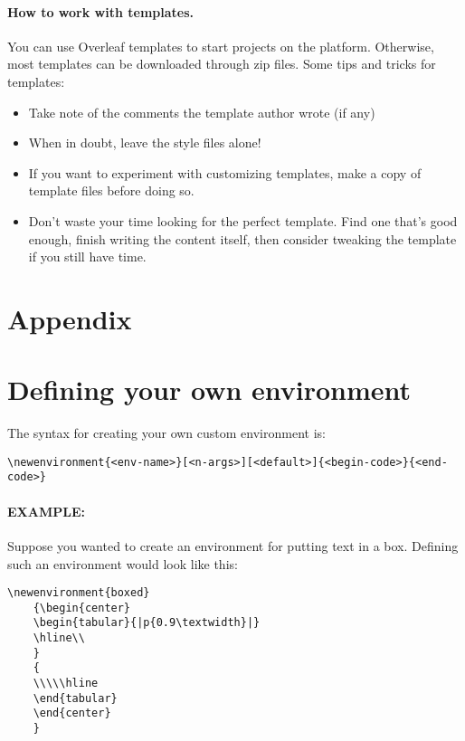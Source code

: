 \documentclass[11pt]{article}
\begin{document}
\paragraph{How to work with templates.} You can use Overleaf templates to start projects on the platform. Otherwise, most templates can be downloaded through zip files. Some tips and tricks for templates:

\begin{itemize}[noitemsep]
    \item Take note of the comments the template author wrote (if any)
    \item When in doubt, leave the style files alone!
    \item If you want to experiment with customizing templates, make a copy of template files before doing so.
    \item Don't waste your time looking for the perfect template. Find one that's good enough, finish writing the content itself, then consider tweaking the template if you still have time.
\end{itemize}




\appendix
\newpage
\section*{Appendix}

\section{Defining your own environment}

The syntax for creating your own custom environment is:

\begin{lstlisting}
\newenvironment{<env-name>}[<n-args>][<default>]{<begin-code>}{<end-code>}
\end{lstlisting}

\paragraph{EXAMPLE:} Suppose you wanted to create an environment for putting text in a box. Defining such an environment would look like this:

\begin{lstlisting}
\newenvironment{boxed}
    {\begin{center}
    \begin{tabular}{|p{0.9\textwidth}|}
    \hline\\
    }
    {
    \\\\\hline
    \end{tabular}
    \end{center}
    }
\end{lstlisting}
\end{document}
